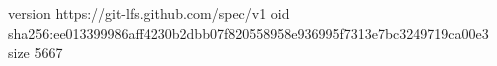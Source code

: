 version https://git-lfs.github.com/spec/v1
oid sha256:ee013399986aff4230b2dbb07f820558958e936995f7313e7bc3249719ca00e3
size 5667
